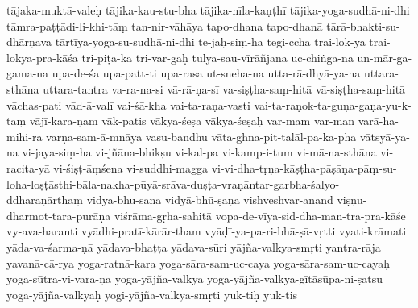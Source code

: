 {{tājaka-muktā-valeḥ
tājika-kau-stu-bha
tājika-nīla-kaṇṭhī
tājika-yoga-sudhā-ni-dhi
tāmra-paṭṭādi-li-khi-tāṃ
tan-nir-vāhāya
tapo-dhana
tapo-dhanā
tārā-bhakti-su-dhārṇava
tārtīya-yoga-su-sudhā-ni-dhi
te-jaḥ-siṃ-ha
tegi-ccha
trai-lok-ya
trai-lokya-pra-kāśa
tri-piṭa-ka
tri-var-gaḥ
tulya-sau-vīrāñjana
uc-chiṅga-na
un-mār-ga-gama-na
upa-de-śa
upa-patt-ti
upa-rasa
ut-sneha-na
utta-rā-dhyā-ya-na
uttara-sthāna
uttara-tantra
va-ra-na-si
vā-rā-ṇa-sī
va-siṣṭha-saṃ-hitā
vā-siṣṭha-saṃ-hitā
vāchas-pati
vād-ā-valī
vai-śā-kha
vai-ta-raṇa-vasti
vai-ta-raṇok-ta-guṇa-gaṇa-yu-k-taṃ
vājī-kara-ṇam
vāk-patis
vākya-śeṣa
vākya-śeṣaḥ
var-mam
var-man
varā-ha-mihi-ra
varṇa-sam-ā-mnāya
vasu-bandhu
vāta-ghna-pit-talāl-pa-ka-pha
vātsyā-ya-na
vi-jaya-siṃ-ha
vi-jñāna-bhikṣu
vi-kal-pa
vi-kamp-i-tum
vi-mā-na-sthāna
vi-racita-yā
vi-śiṣṭ-āṃśena
vi-suddhi-magga
vi-vi-dha-tṛṇa-kāṣṭha-pāṣāṇa-pāṃ-su-loha-loṣṭāsthi-bāla-nakha-pūyā-srāva-duṣṭa-vraṇāntar-garbha-śalyo-ddharaṇārthaṃ
vidya-bhu-sana
vidyā-bhū-ṣaṇa
vishveshvar-anand
viṣṇu-dharmot-tara-purāṇa
viśrāma-gṛha-sahitā
vopa-de-vīya-sid-dha-man-tra-pra-kāśe
vy-ava-haranti
vyādhi-pratī-kārār-tham
vyāḍī-ya-pa-ri-bhā-ṣā-vṛtti
vyati-krāmati
yāda-va-śarma-ṇā
yādava-bhaṭṭa
yādava-sūri
yājña-valkya-smṛti
yantra-rāja
yavanā-cā-rya
yoga-ratnā-kara
yoga-sāra-sam-uc-caya
yoga-sāra-sam-uc-cayaḥ
yoga-sūtra-vi-vara-ṇa
yoga-yājña-valkya
yoga-yājña-valkya-gītāsūpa-ni-ṣatsu
yoga-yājña-valkyaḥ
yogi-yājña-valkya-smṛti
yuk-tiḥ
yuk-tis
}}
\normalfontlatin%
\endinput
